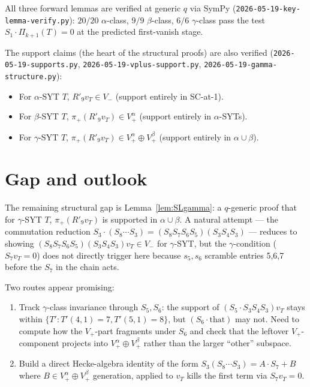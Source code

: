 \documentclass[11pt]{article}
\newcommand{\Vp}{V_{+}}
\newcommand{\Vm}{V_{-}}
\newcommand{\Vpalpha}{V_{+}^{\alpha}}
\newcommand{\Vpbeta}{V_{+}^{\beta}}
\begin{document}
All three forward lemmas are verified at generic $q$ via SymPy
(\texttt{2026-05-19-key-lemma-verify.py}): $20/20$ $\alpha$-class, $9/9$
$\beta$-class, $6/6$ $\gamma$-class pass the test
$S_1 \cdot \Pi_{k+1}(T) = 0$ at the predicted first-vanish stage.

The support claims (the heart of the structural proofs) are also verified
(\texttt{2026-05-19-supports.py},
\texttt{2026-05-19-vplus-support.py},
\texttt{2026-05-19-gamma-structure.py}):
\begin{itemize}
\item For $\alpha$-SYT $T$, $R'_9 v_T \in \Vm$ (support entirely in SC-at-1).
\item For $\beta$-SYT $T$, $\pi_+(R'_9 v_T) \in \Vpalpha$
(support entirely in $\alpha$-SYTs).
\item For $\gamma$-SYT $T$, $\pi_+(R'_9 v_T) \in \Vpalpha \oplus \Vpbeta$
(support entirely in $\alpha \cup \beta$).
\end{itemize}

\section{Gap and outlook}

The remaining structural gap is Lemma~\ref{lem:SLgamma}: a $q$-generic proof that
for $\gamma$-SYT $T$, $\pi_+(R'_9 v_T)$ is supported in $\alpha \cup \beta$.
A natural attempt — the commutation reduction
$S_3 \cdot (S_8 \cdots S_3) = (S_8 S_7 S_6 S_5)(S_3 S_4 S_3)$ — reduces
to showing $(S_8 S_7 S_6 S_5)(S_3 S_4 S_3) v_T \in \Vm$ for $\gamma$-SYT,
but the $\gamma$-condition ($S_7 v_T = 0$) does not directly trigger here
because $s_5, s_6$ scramble entries 5,6,7 before the $S_7$ in the chain acts.

Two routes appear promising:
\begin{enumerate}
\item Track $\gamma$-class invariance through $S_5, S_6$: the support of
$(S_5 \cdot S_3 S_4 S_3) v_T$ stays within $\{T'  : T'(4,1)=7, T'(5,1)=8\}$,
but $(S_6 \cdot \text{that})$ may not. Need to compute how the $\Vp$-part
fragments under $S_6$ and check that the leftover $\Vp$-component
projects into $\Vpalpha \oplus \Vpbeta$ rather than the larger ``other'' subspace.
\item Build a direct Hecke-algebra identity of the form
$S_3 (S_8 \cdots S_3) = A \cdot S_7 + B$ where $B \in \Vpalpha \oplus \Vpbeta$
generation, applied to $v_T$ kills the first term via $S_7 v_T = 0$.
\end{enumerate}
\end{document}
